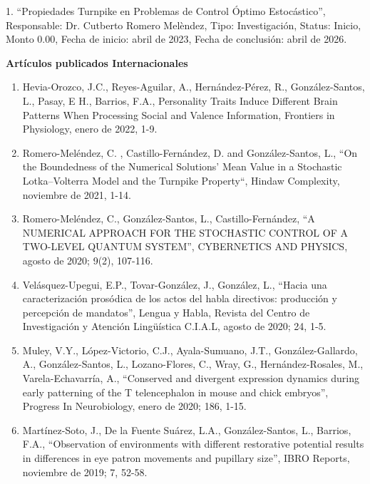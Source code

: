 \documentclass[12pt]{article}
\begin{document}
\hfill

1. “Propiedades Turnpike en Problemas de Control Óptimo Estocástico”, Responsable: Dr. Cutberto Romero Melèndez, Tipo: Investigación, 
Status: Inicio, Monto 0.00, Fecha de inicio: abril de 2023, Fecha de conclusión: abril de 2026.

\hfill

\textbf{Artículos publicados Internacionales}

\begin{enumerate}
\item Hevia-Orozco, J.C., Reyes-Aguilar, A., Hernández-Pérez, R., González-Santos, L., Pasay, E H., Barrios, F.A., Personality Traits 
Induce Different Brain Patterns When Processing Social and Valence Information, Frontiers in Physiology, enero de 2022, 1-9.

\item Romero-Meléndez, C. , Castillo-Fernández, D. and González-Santos, L., “On the Boundedness of the Numerical Solutions’ Mean Value 
in 
a Stochastic Lotka–Volterra Model and the Turnpike Property“, Hindaw Complexity, noviembre de 2021, 1-14.

\item Romero-Meléndez, C., González-Santos, L., Castillo-Fernández, “A NUMERICAL APPROACH FOR THE STOCHASTIC CONTROL OF A TWO-LEVEL 
QUANTUM SYSTEM”, CYBERNETICS AND PHYSICS, agosto de 2020; 9(2), 107-116.

\item Velásquez-Upegui, E.P., Tovar-González, J., González, L., “Hacia una caracterización prosódica de los actos del habla directivos: 
producción y percepción de mandatos”, Lengua y Habla, Revista del Centro de Investigación y Atención Lingüística C.I.A.L, agosto de 
2020; 24, 1-5.

\item Muley, V.Y., López-Victorio, C.J., Ayala-Sumuano, J.T., González-Gallardo, A., González-Santos, L., Lozano-Flores, C., Wray, G., 
Hernández-Rosales, M., Varela-Echavarría, A., “Conserved and divergent expression dynamics during early patterning of the T 
telencephalon in mouse and chick embryos”, Progress In Neurobiology, enero de 2020; 186, 1-15.

\item Martínez-Soto, J., De la Fuente Suárez, L.A., González-Santos, L., Barrios, F.A., “Observation of environments with different 
restorative potential results in differences in eye patron movements and pupillary size”, IBRO Reports, noviembre de 2019; 7, 52-58.


\end{enumerate}
\end{document}
